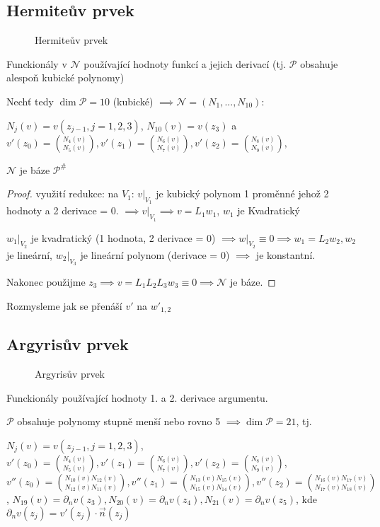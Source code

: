 \documentclass[../main.tex]{subfiles}
\begin{document}
\subsection{Hermiteův prvek}

\begin{figure}[ht]
    \centering
    \caption{Hermiteův prvek}
\end{figure}

Funckionály v $\mathcal{N}$ používající hodnoty funkcí a jejich derivací (tj. $\mathcal{P}$ obsahuje alespoň kubické polynomy)

Nechť tedy $\dim\mathcal{P}=10$ (kubické) $\implies \mathcal{N} = (N_1,...,N_{10}):$

$N_j(v) = v(z_{j-1}, j = 1,2,3)$, $N_10(v) = v(z_3)$ a $v'(z_0)=\binom{N_4(v)}{N_5(v)}, v'(z_1)=\binom{N_6(v)}{N_7(v)}, v'(z_2)=\binom{N_8(v)}{N_9(v)},$

\begin{claim}
    $\mathcal{N}$ je báze $\mathcal{P}^\#$
\end{claim}

\begin{proof}
    využití redukce: na $V_1$: $v|_{V_1}$ je kubický polynom 1 proměnné jehož 2 hodnoty a 2 derivace = 0.
    $\implies v|_{V_1} \implies v=L_1w_1$, $w_1$ je Kvadratický

    $w_1|_{V_2}$ je kvadratický (1 hodnota, 2 derivace = 0) $\implies w|_{V_2}\equiv0\implies w_1=L_2w_2, w_2$ je lineární, $w_2|_{V_3}$ je lineární polynom (derivace = 0) $\implies$ je konstantní.

    Nakonec použijme $z_3 \implies v=L_1L_2L_3w_3\equiv0\implies\mathcal{N}$ je báze.
\end{proof}

Rozmysleme jak se přenáší $v'$ na $w'_{1,2}$


\subsection{Argyrisův prvek}

\begin{figure}[ht]
    \centering
    \caption{Argyrisův prvek}
\end{figure}
Funckionály používající hodnoty 1. a 2. derivace argumentu.

$\mathcal{P}$ obsahuje polynomy stupně menší nebo rovno 5 $\implies \dim\mathcal{P}=21$, tj. 

$N_j(v) = v(z_{j-1}, j = 1,2,3)$, $v'(z_0)=\binom{N_4(v)}{N_5(v)}, v'(z_1)=\binom{N_6(v)}{N_7(v)}, v'(z_2)=\binom{N_8(v)}{N_9(v)}$, $v''(z_0)=\binom{N_10(v)N_12(v)}{N_12(v)N_11(v)}, v''(z_1)=\binom{N_13(v)N_15(v)}{N_15(v)N_14(v)}, v''(z_2)=\binom{N_16(v)N_17(v)}{N_17(v)N_18(v)}$, 
$N_{19}(v) = \partial_n v(z_3),N_{20}(v) = \partial_n v(z_4),N_{21}(v) = \partial_n v(z_5)$, kde $\partial_n v(z_j) = v'(z_j)\cdot \vec{n}(z_j)$
\end{document}

